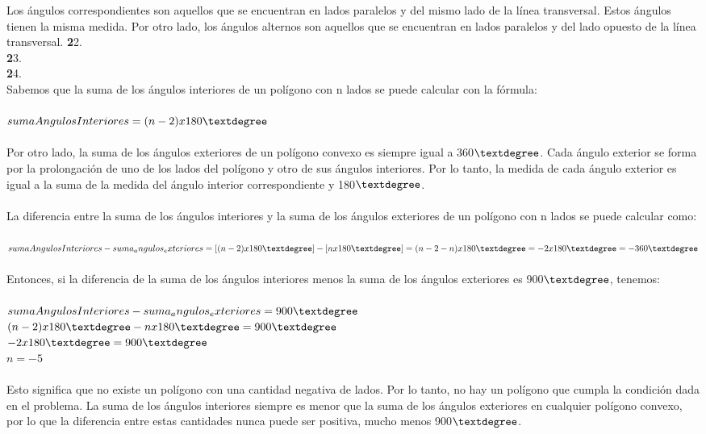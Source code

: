 \documentclass{article}
\begin{document}
Los ángulos correspondientes son aquellos que se encuentran en lados paralelos y del mismo lado de la línea transversal. Estos ángulos tienen la misma medida. Por otro lado, los ángulos alternos son aquellos que se encuentran en lados paralelos y del lado opuesto de la línea transversal.
{\textbf 22. }\\
{\textbf 23. }\\
{\textbf 24. }\\
Sabemos que la suma de los ángulos interiores de un polígono con n lados se puede calcular con la fórmula:\\
\\
$sumaAngulosInteriores = (n - 2) x 180\textdegree$\\
\\
Por otro lado, la suma de los ángulos exteriores de un polígono convexo es siempre igual a 360$\textdegree$. Cada ángulo exterior se forma por la prolongación de uno de los lados del polígono y otro de sus ángulos interiores. Por lo tanto, la medida de cada ángulo exterior es igual a la suma de la medida del ángulo interior correspondiente y 180$\textdegree$.\\
\\
La diferencia entre la suma de los ángulos interiores y la suma de los ángulos exteriores de un polígono con n lados se puede calcular como:\\
\\
$sumaAngulosInteriores - suma_angulos_exteriores = [(n - 2) x 180\textdegree] - [n x 180\textdegree] = (n - 2 - n) x 180\textdegree = -2 x 180\textdegree = -360\textdegree$\\
\\
Entonces, si la diferencia de la suma de los ángulos interiores menos la suma de los ángulos exteriores es 900$\textdegree$, tenemos:\\
\\
$sumaAngulosInteriores - suma_angulos_exteriores = 900\textdegree$\\
$(n - 2) x 180\textdegree - n x 180\textdegree = 900\textdegree$\\
$-2 x 180\textdegree = 900\textdegree$\\
$n = -5$\\
\\
Esto significa que no existe un polígono con una cantidad negativa de lados. Por lo tanto, no hay un polígono que cumpla la condición dada en el problema. La suma de los ángulos interiores siempre es menor que la suma de los ángulos exteriores en cualquier polígono convexo, por lo que la diferencia entre estas cantidades nunca puede ser positiva, mucho menos 900$\textdegree$.\\
\end{document}
